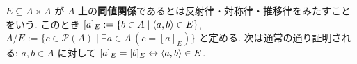 \begin{dfn}[同値関係と商集合]
  $E \subseteq A \times A$ が $A$ 上の\textbf{同値関係}であるとは反射律・対称律・推移律をみたすことをいう. このとき $[a]_E := \{b \in A \mid \langle a,b\rangle \in E\}$, $A/E := \{c \in \mathcal{P}(A) \mid \exists a \in A\,(c = [a]_E)\}$ と定める. 次は通常の通り証明される: $a, b \in A$ に対して $[a]_E = [b]_E \leftrightarrow \langle a,b\rangle \in E$.
\end{dfn}
